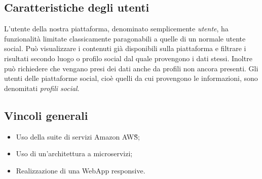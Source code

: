 \subsection{Caratteristiche degli utenti}
L'utente della nostra piattaforma, denominato semplicemente \textit{utente}, ha funzionalità limitate classicamente paragonabili a quelle di un normale utente social.
Può visualizzare i contenuti già disponibili sulla piattaforma e filtrare i risultati secondo luogo o profilo social dal quale provengono i dati stessi.
Inoltre può richiedere che vengano presi dei dati anche da profili non ancora presenti.
Gli utenti delle piattaforme social, cioè quelli da cui provengono le informazioni, sono denomitati \textit{profili social}.

\newpage
\subsection{Vincoli generali}
\begin{itemize}
	\item Uso della suite di servizi Amazon AWS\G{};
	\item Uso di un'architettura a microservizi;
	\item Realizzazione di una WebApp responsive.
\end{itemize}
